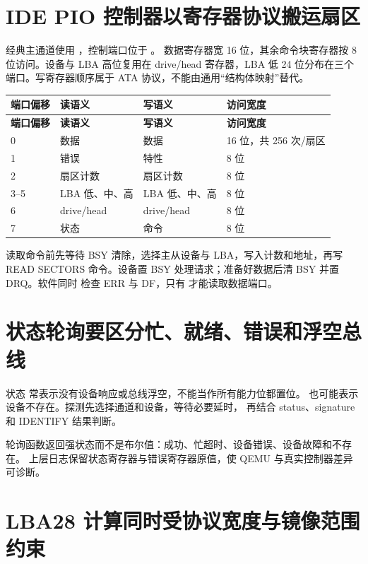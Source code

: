 \section{IDE PIO 控制器以寄存器协议搬运扇区}

经典主通道使用 ，控制端口位于 。
数据寄存器宽 16 位，其余命令块寄存器按 8 位访问。设备与 LBA 高位复用在
drive/head 寄存器，LBA 低 24 位分布在三个端口。写寄存器顺序属于 ATA
协议，不能由通用“结构体映射”替代。

\begin{longtable}{L{0.16\textwidth}L{0.23\textwidth}L{0.24\textwidth}L{0.25\textwidth}}
\toprule
\textbf{端口偏移} & \textbf{读语义} & \textbf{写语义} & \textbf{访问宽度}\\
\midrule
\endfirsthead
\toprule
\textbf{端口偏移} & \textbf{读语义} & \textbf{写语义} & \textbf{访问宽度}\\
\midrule
{} & 数据 & 数据 & 16 位，共 256 次/扇区\\
1 & 错误 & 特性 & 8 位\\
2 & 扇区计数 & 扇区计数 & 8 位\\
3--5 & LBA 低、中、高 & LBA 低、中、高 & 8 位\\
6 & drive/head & drive/head & 8 位\\
7 & 状态 & 命令 & 8 位\\
\bottomrule
\end{longtable}

读取命令前先等待 BSY 清除，选择主从设备与 LBA，写入计数和地址，再写 READ
SECTORS 命令。设备置 BSY 处理请求；准备好数据后清 BSY 并置 DRQ。软件同时
检查 ERR 与 DF，只有  才能读取数据端口。

\section{状态轮询要区分忙、就绪、错误和浮空总线}

状态  常表示没有设备响应或总线浮空，不能当作所有能力位都置位。
 也可能表示设备不存在。探测先选择通道和设备，等待必要延时，
再结合 status、signature 和 IDENTIFY 结果判断。

轮询函数返回强状态而不是布尔值：成功、忙超时、设备错误、设备故障和不存在。
上层日志保留状态寄存器与错误寄存器原值，使 QEMU 与真实控制器差异可诊断。

\section{LBA28 计算同时受协议宽度与镜像范围约束}

